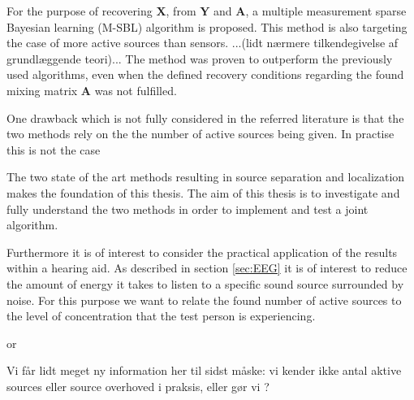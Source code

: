 For the purpose of recovering $\textbf{X}$, from $\textbf{Y}$ and $\textbf{A}$, a multiple measurement sparse Bayesian learning (M-SBL) algorithm is proposed. This method is also targeting the case of more active sources than sensors. ...(lidt nærmere tilkendegivelse af grundlæggende teori)...
The method was proven to outperform the previously used algorithms, even when the defined recovery conditions regarding the found mixing matrix $\textbf{A}$ was not fulfilled\cite{Balkan2014}.

One drawback which is not fully considered in the referred literature is that the two methods rely on the the number of active sources being given. 
In practise this is not the case 


The two state of the art methods resulting in source separation and localization makes the foundation of this thesis. 
The aim of this thesis is to investigate and fully understand the two methods in order to implement and test a joint algorithm. 

Furthermore it is of interest to consider the practical application of the results within a hearing aid.  
As described in section \ref{sec:EEG} it is of interest to reduce the amount of energy it takes to listen to a specific sound source surrounded by noise.
For this purpose we want to relate the found number of active sources to the level of concentration that the test person is experiencing.  

or 

Vi får lidt meget ny information her til sidst måske:
vi kender ikke antal aktive sources eller source overhoved i praksis, eller gør vi ?


 
